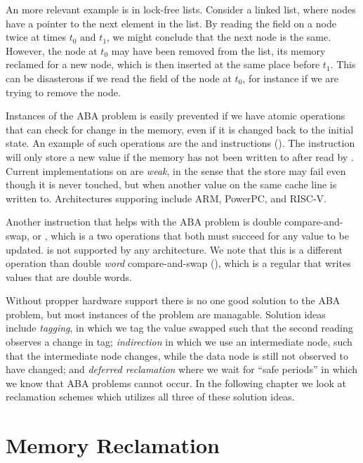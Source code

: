 \documentclass[b5paper]{report}
\begin{document}
An more relevant example is in lock-free lists. Consider a linked list, where
nodes have a  pointer to the next element in the list.  By reading
the  field on a node twice at times $t_0$ and $t_1$, we might
conclude that the next node is the same. However, the node at $t_0$ may have
been removed from the list, its memory reclamed for a new node, which is then
inserted at the same place before $t_1$. This can be disasterous if we read the
 field of the node at $t_0$, for instance if we are trying to remove
the node.

Instances of the ABA problem is easily prevented if we have atomic operations
that can check for change in the memory, even if it is changed back to the
initial state. An example of such operations are the  and
 instructions (). The  instruction
will only store a new value if the memory has not been written to after read by
. Current implementations on  are \emph{weak}, in the sense
that the store may fail even though it is never touched, but when another value
on the same cache line is written to. Architectures supporing 
include ARM, PowerPC, and RISC-V.

Another instruction that helps with the ABA problem is double compare-and-swap,
or , which is a two  operations that both must succeed for
any value to be updated.  is not supported by any architecture. We
note that this is a different operation than double \emph{word} compare-and-swap
(), which is a regular  that writes values that are double
words.

Without propper hardware support there is no one good solution to the ABA
problem, but most instances of the problem are managable. Solution ideas include
\emph{tagging}, in which we tag the value swapped such that the second reading
observes a change in tag; \emph{indirection} in which we use an intermediate
node, such that the intermediate node changes, while the data node is still not
observed to have changed; and \emph{deferred reclamation} where we wait for
``safe periods'' in which we know that ABA problems cannot occur. In the
following chapter we look at reclamation schemes which utilizes all three of
these solution ideas.



\chapter{Memory Reclamation}
\end{document}
